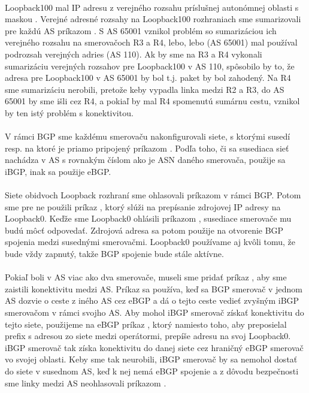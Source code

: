 \documentclass[12pt,twoside,a4paper]{report}
\begin{document}
\paragraph{}
Loopback100 mal IP adresu z verejného rozsahu príslušnej autonómnej oblasti s maskou . Verejné adresné rozsahy na Loopback100 rozhraniach sme sumarizovali pre každú AS príkazom . S AS 65001 vznikol problém so sumarizáciou ich verejného rozsahu na smerovačoch R3 a R4, lebo, lebo  (AS 65001) mal používal podrozsah verejných adries  (AS 110). Ak by sme na R3 a R4 vykonali sumarizáciu verejných rozsahov pre Loopback100 v AS 110, spôsobilo by to, že  adresa pre Loopback100 v AS 65001 by bol  t.j. paket by bol zahodený. Na R4 sme sumarizáciu nerobili, pretože keby vypadla linka medzi R2 a R3, do AS 65001 by sme išli cez R4, a pokiaľ by mal R4 spomenutú sumárnu cestu, vznikol by ten istý problém s konektivitou.

\paragraph{}
V rámci BGP sme každému smerovaču nakonfigurovali siete, s ktorými susedí resp. na ktoré je priamo pripojený príkazom . Podľa toho, či sa susediaca sieť nachádza v AS s rovnakým číslom ako je ASN daného smerovača, použije sa iBGP, inak sa použije eBGP. 

\paragraph{}
Siete obidvoch Loopback rozhraní sme ohlasovali príkazom  v rámci BGP. Potom sme pre ne použili príkaz , ktorý slúži na prepísanie zdrojovej IP adresy na Loopback0. Keďže sme Loopback0 ohlásili príkazom , susediace smerovače mu budú môcť odpovedať. Zdrojová adresa sa potom použije na otvorenie BGP spojenia medzi susednými smerovačmi. Loopback0 používame aj kvôli tomu, že bude vždy zapnutý, takže BGP spojenie bude stále aktívne.

\paragraph{}
Pokiaľ boli v AS viac ako dva smerovače, museli sme pridať príkaz , aby sme zaistili konektivitu medzi AS. Príkaz  sa používa, keď sa BGP smerovač v jednom AS dozvie o ceste z iného AS cez eBGP a dá o tejto ceste vedieť zvyšným iBGP smerovačom v rámci svojho AS. Aby mohol iBGP smerovač získať konektivitu do tejto siete, použijeme na eBGP príkaz , ktorý namiesto toho, aby preposielal prefix s  adresou zo siete medzi operátormi, prepíše  adresu na svoj Loopback0. iBGP smerovač tak získa konektivitu do danej siete cez hraničný eBGP smerovač vo svojej oblasti. Keby sme tak neurobili, iBGP smerovač by sa nemohol dostať do siete v susednom AS, keď k nej nemá eBGP spojenie a z dôvodu bezpečnosti sme linky medzi AS neohlasovali príkazom .
\end{document}
